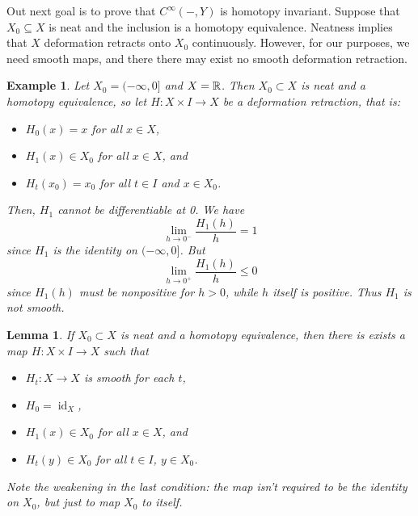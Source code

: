 \documentclass{article}
\newtheorem{lemma}[theorem]{Lemma}
\newtheorem{example}[theorem]{Example}
\newtheorem{proposed work}[theorem]{Proposed Work}
\theoremstyle{definition}
\DeclareMathOperator{\id}{id}
\begin{document}
Out next goal is to prove that $C^\infty(-,Y)$ is homotopy invariant. Suppose that $X_0\subseteq X$ is neat and the inclusion is a homotopy equivalence. Neatness implies that $X$ deformation retracts onto $X_0$ continuously. However, for our purposes, we need smooth maps, and there there may exist no smooth deformation retraction.
\begin{example}
  Let $X_0 = (-\infty,0]$ and $X=\mathbb R$. Then $X_0\subset X$ is neat and a homotopy equivalence, so let $H:X\times I\to X$ be a deformation retraction, that is:
  \begin{itemize}
  \item $H_0(x)=x$ for all $x\in X$,
  \item $H_1(x)\in X_0$ for all $x\in X$, and
  \item $H_t(x_0)=x_0$ for all $t\in I$ and $x\in X_0$.
  \end{itemize}
 Then, $H_1$ cannot be differentiable at 0. We have
\[
\lim_{h\to0^-}\frac{H_1(h)}{h} = 1
\]
since $H_1$ is the identity on $(-\infty,0]$. But
\[
\lim_{h\to0^+}\frac{H_1(h)}{h} \le 0
\]
since $H_1(h)$ must be nonpositive for $h>0$, while $h$ itself is positive. Thus $H_1$ is not smooth.
\end{example}
\begin{lemma}
  If $X_0\subset X$ is neat and a homotopy equivalence, then there is exists a map $H:X\times I\to X$ such that
  \begin{itemize}
  \item $H_t: X\to X$ is smooth for each $t$,
  \item $H_0 = \id_X$,
  \item $H_1(x)\in X_0$ for all $x\in X$, and
  \item $H_t(y)\in X_0$ for all $t\in I$, $y\in X_0$.
  \end{itemize}
Note the weakening in the last condition: the map isn't required to be the identity on $X_0$, but just to map $X_0$ to itself.
\end{lemma}
\end{document}
